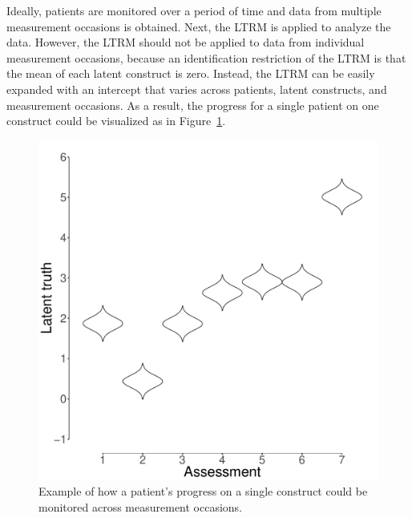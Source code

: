 \documentclass{article}
\begin{document}
Ideally, patients are monitored over a period of time and data from multiple measurement occasions is obtained. Next, the LTRM is applied to analyze the data. However, the LTRM should not be applied to data from individual measurement occasions, because an identification restriction of the LTRM is that the mean of each latent construct is zero. Instead, the LTRM can be easily expanded with an intercept that varies across patients, latent constructs, and measurement occasions. As a result, the progress for a single patient on one construct could be visualized as in Figure~\ref{fig:progressMonitoring}.

\begin{figure}[!ht]
	\includegraphics[width=\linewidth]{figures/progressMonitoring.pdf}
	\caption{Example of how a patient's progress on a single construct could be monitored across measurement occasions.}
	\label{fig:progressMonitoring}
\end{figure}
\end{document}

